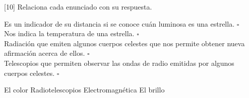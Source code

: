 [10] Relaciona cada enunciado con su respuesta.

\begin{multicols}{2}
    \begin{flushright}
        Es un indicador de su distancia si se conoce cuán luminosa es una estrella. $\square$\\ \vspace{0.5cm}
        Nos indica la temperatura de una estrella. $\square$\\ \vspace{0.5cm}
        Radiación que emiten algunos cuerpos celestes que nos permite obtener nueva afirmación acerca de ellos. $\square$\\ \vspace{0.5cm}
        Telescopios que permiten observar las ondas de radio emitidas por algunos cuerpos celestes. $\square$\\ \vspace{0.5cm}

    \end{flushright}
    \vspace{1cm}
    \begin{checkboxes}
        \choice El color         \vspace{0.8cm}
        \choice Radiotelescopios \vspace{0.8cm}
        \choice Electromagnética \vspace{0.8cm}
        \choice El brillo        \vspace{0.8cm}
    \end{checkboxes}
\end{multicols}